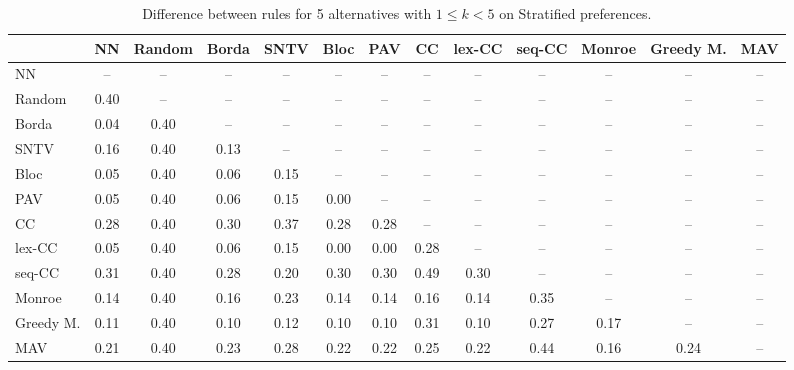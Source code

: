 
\begin{table*}[h!]
\centering
\begin{tabular}{lcccccccccccc}
\toprule
 & NN & Random & Borda & SNTV & Bloc & PAV & CC & lex-CC & seq-CC & Monroe & Greedy M. & MAV \\
\midrule
NN & -- & -- & -- & -- & -- & -- & -- & -- & -- & -- & -- & -- \\
Random & 0.40 & -- & -- & -- & -- & -- & -- & -- & -- & -- & -- & -- \\
Borda & 0.04 & 0.40 & -- & -- & -- & -- & -- & -- & -- & -- & -- & -- \\
SNTV & 0.16 & 0.40 & 0.13 & -- & -- & -- & -- & -- & -- & -- & -- & -- \\
Bloc & 0.05 & 0.40 & 0.06 & 0.15 & -- & -- & -- & -- & -- & -- & -- & -- \\
PAV & 0.05 & 0.40 & 0.06 & 0.15 & 0.00 & -- & -- & -- & -- & -- & -- & -- \\
CC & 0.28 & 0.40 & 0.30 & 0.37 & 0.28 & 0.28 & -- & -- & -- & -- & -- & -- \\
lex-CC & 0.05 & 0.40 & 0.06 & 0.15 & 0.00 & 0.00 & 0.28 & -- & -- & -- & -- & -- \\
seq-CC & 0.31 & 0.40 & 0.28 & 0.20 & 0.30 & 0.30 & 0.49 & 0.30 & -- & -- & -- & -- \\
Monroe & 0.14 & 0.40 & 0.16 & 0.23 & 0.14 & 0.14 & 0.16 & 0.14 & 0.35 & -- & -- & -- \\
Greedy M. & 0.11 & 0.40 & 0.10 & 0.12 & 0.10 & 0.10 & 0.31 & 0.10 & 0.27 & 0.17 & -- & -- \\
MAV & 0.21 & 0.40 & 0.23 & 0.28 & 0.22 & 0.22 & 0.25 & 0.22 & 0.44 & 0.16 & 0.24 & -- \\
\bottomrule
\end{tabular}

\caption{Difference between rules for 5 alternatives with $1 \leq k < 5$ on Stratified preferences.}
\end{table*}
